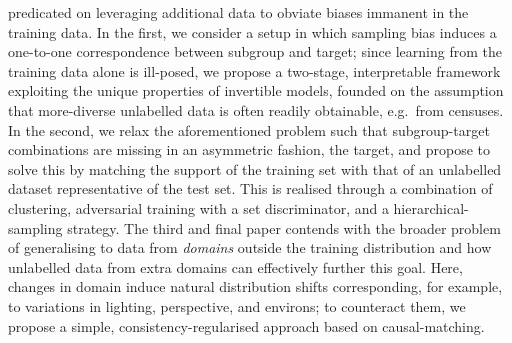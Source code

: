 predicated on leveraging additional data to obviate biases immanent in the training data.
%
In the first, we consider a setup in which sampling bias induces a one-to-one correspondence
between subgroup and target; since learning from the training data alone is ill-posed, we propose a
two-stage, interpretable framework exploiting the unique properties of invertible models, founded
on the assumption that more-diverse unlabelled data is often readily obtainable, e.g.\ from
censuses.
%
In the second, we relax the aforementioned problem such that subgroup-target combinations are
missing in an asymmetric fashion, \wrt{} the target, and propose to solve this by matching the
support of the training set with that of an unlabelled dataset representative of the test set. 
%
This is realised through a combination of clustering, adversarial training with a set
discriminator, and a hierarchical-sampling strategy.
%
The third and final paper contends with the broader problem of generalising to data from
\emph{domains} outside the training distribution  and how unlabelled data from extra domains can
effectively further this goal.
%
Here, changes in domain induce natural distribution shifts corresponding, for example, to
variations in lighting, perspective, and environs; to counteract them, we propose a simple,
consistency-regularised approach based on causal-matching.


\endgroup

\vfill
